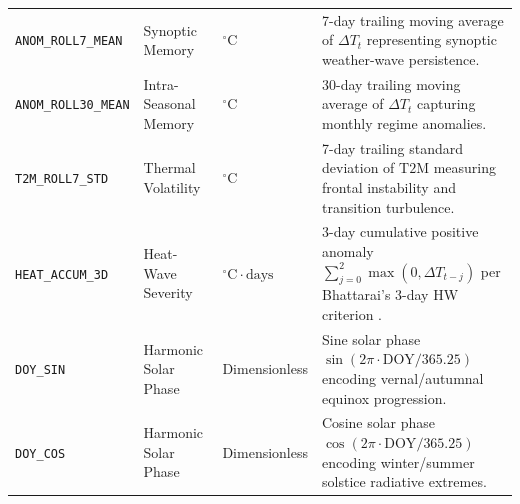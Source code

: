 \documentclass[conference]{IEEEtran}
\begin{document}
\begin{table}[!t]
\begin{tabularx}{\textwidth}{l l l X}
\texttt{ANOM\_ROLL7\_MEAN} & Synoptic Memory & $^\circ\text{C}$ & 7-day trailing moving average of $\Delta T_t$ representing synoptic weather-wave persistence. \\
\texttt{ANOM\_ROLL30\_MEAN} & Intra-Seasonal Memory & $^\circ\text{C}$ & 30-day trailing moving average of $\Delta T_t$ capturing monthly regime anomalies. \\
\texttt{T2M\_ROLL7\_STD} & Thermal Volatility & $^\circ\text{C}$ & 7-day trailing standard deviation of $\text{T2M}$ measuring frontal instability and transition turbulence. \\
\texttt{HEAT\_ACCUM\_3D} & Heat-Wave Severity & $^\circ\text{C}\cdot\text{days}$ & 3-day cumulative positive anomaly $\sum_{j=0}^{2}\max(0, \Delta T_{t-j})$ per Bhattarai's 3-day HW criterion \cite{bhattarai2022}. \\
\texttt{DOY\_SIN} & Harmonic Solar Phase & Dimensionless & Sine solar phase $\sin(2\pi \cdot \text{DOY} / 365.25)$ encoding vernal/autumnal equinox progression. \\
\texttt{DOY\_COS} & Harmonic Solar Phase & Dimensionless & Cosine solar phase $\cos(2\pi \cdot \text{DOY} / 365.25)$ encoding winter/summer solstice radiative extremes. \\
\bottomrule
\end{tabularx}
\end{table}
\end{document}
